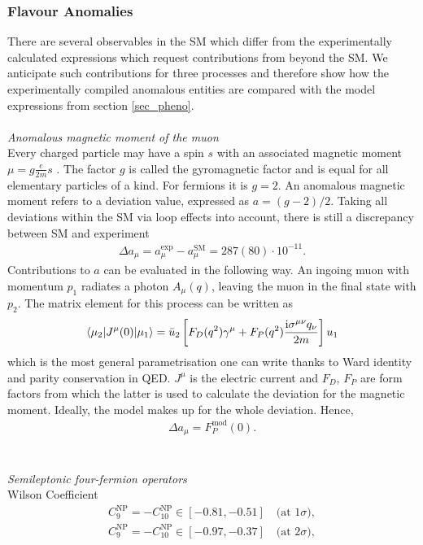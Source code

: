 \subsubsection{Flavour Anomalies}
\label{sec_flAnom}
There are several observables in the SM which differ from the experimentally calculated expressions which request contributions from beyond the 
SM. We anticipate such contributions for three processes and therefore show how the experimentally compiled anomalous entities are compared with
the model expressions from section \ref{sec_pheno}.
\\ \\\textit{Anomalous magnetic moment of the muon}\\
\noindent
Every charged particle
may have a spin $s$ with an associated magnetic moment $ \mu = g \frac{e}{2m}s$ \cite{anomMom}.
The factor $g$ is called the gyromagnetic factor and is equal for all elementary particles of a kind. For fermions it is $g=2$. An anomalous
magnetic moment refers to a deviation value, expressed as $a=(g-2)/2$. Taking all deviations within the SM via loop effects into account, there
is still a discrepancy between SM and experiment 
\begin{align}
 \Delta a_\mu = a_\mu^\text{exp} - a_\mu^\text{SM} = 287(80)\cdot 10^{-11}.
\end{align}
Contributions to $a$ can be evaluated in the following way. An ingoing muon with momentum $p_1$ radiates a photon $A_\mu (q)$, leaving the muon in the final 
state with $p_2$. The matrix element for this process can be written as
\begin{align}
 \langle \mu_2|J^\mu(0)|\mu_1\rangle = \bar u_2 \left[F_D(q^2)\gamma^\mu + F_P(q^2)\frac{\text{i} \sigma^{\mu\nu}q_\nu}{2m}\right] u_1
 \label{eq_gordon}
\end{align}
which is the most general parametrisation one can write thanks to Ward identity and parity conservation in QED. $J^\mu$ is the electric current
and $F_D$, $F_P$ are form factors from which the latter is used to calculate the deviation for the magnetic moment. Ideally, the model makes up
for the whole deviation. Hence,
\begin{align}
 \Delta a_\mu = F_P^\text{mod}(0).
\end{align}
\\ \\ \textit{Semileptonic four-fermion operators}\\
Wilson Coefficient \cite{150306199} \cite{1608.07832}
\begin{align}
 C_9^\text{NP} = -C_{10}^\text{NP} \in [-0.81,-0.51]\quad \text{(at 1}\sigma),\\
 C_9^\text{NP} = -C_{10}^\text{NP} \in [-0.97,-0.37]\quad \text{(at 2}\sigma),
 \label{eq_mumuBound}
\end{align}
